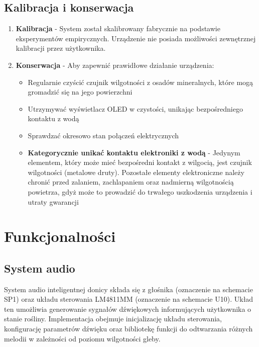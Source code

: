 \documentclass{article}
\begin{document}
\subsection{Kalibracja i konserwacja}
\begin{enumerate}
    \item \textbf{Kalibracja} - System został skalibrowany fabrycznie na podstawie eksperymentów empirycznych. Urządzenie nie posiada możliwości zewnętrznej kalibracji przez użytkownika.
    
    \item \textbf{Konserwacja} - Aby zapewnić prawidłowe działanie urządzenia:
    \begin{itemize}
        \item Regularnie czyścić czujnik wilgotności z osadów mineralnych, które mogą gromadzić się na jego powierzchni
        \item Utrzymywać wyświetlacz OLED w czystości, unikając bezpośredniego kontaktu z wodą
        \item Sprawdzać okresowo stan połączeń elektrycznych
        \item \textbf{Kategorycznie unikać kontaktu elektroniki z wodą} - Jedynym elementem, który może mieć bezpośredni kontakt z wilgocią, jest czujnik wilgotności (metalowe druty). Pozostałe elementy elektroniczne należy chronić przed zalaniem, zachlapaniem oraz nadmierną wilgotnością powietrza, gdyż może to prowadzić do trwałego uszkodzenia urządzenia i utraty gwarancji
    \end{itemize}
\end{enumerate}

\section{Funkcjonalności}












\subsection{System audio}
System audio inteligentnej donicy składa się z głośnika (oznaczenie na schemacie SP1) oraz układu sterowania LM4811MM (oznaczenie na schemacie U10). Układ ten umożliwia generowanie sygnałów dźwiękowych informujących użytkownika o stanie rośliny. Implementacja obejmuje inicjalizację układu sterowania, konfigurację parametrów dźwięku oraz bibliotekę funkcji do odtwarzania różnych melodii w zależności od poziomu wilgotności gleby.
\end{document}
